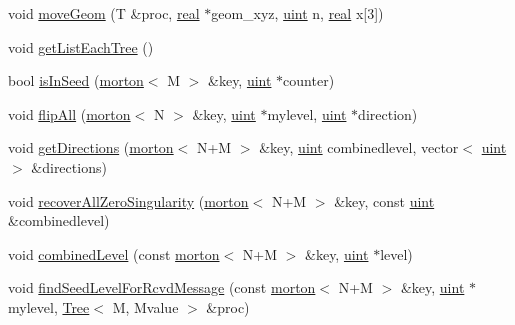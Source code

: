 \begin{DoxyCompactItemize}
void \mbox{\hyperlink{classTemplateForest_a312fad17dc4021537c54119ab91fea87}{move\+Geom}} (T \&proc, \mbox{\hyperlink{definitions_8h_aedc0ad84d1e764530814f57ad931d02a}{real}} $\ast$geom\+\_\+xyz, \mbox{\hyperlink{definitions_8h_a69aa29b598b851b0640aa225a9e5d61d}{uint}} n, \mbox{\hyperlink{definitions_8h_aedc0ad84d1e764530814f57ad931d02a}{real}} x\mbox{[}3\mbox{]})
\item 
void \mbox{\hyperlink{classTemplateForest_abbc3d31a30cf34aa9e511c98ac677627}{get\+List\+Each\+Tree}} ()
\item 
bool \mbox{\hyperlink{classTemplateForest_aacf86db7e5c6a83890d0ae8c03c8ea84}{is\+In\+Seed}} (\mbox{\hyperlink{definitions_8h_af8682350bd8bb38ee9023f7a0a310add}{morton}}$<$ M $>$ \&key, \mbox{\hyperlink{definitions_8h_a69aa29b598b851b0640aa225a9e5d61d}{uint}} $\ast$counter)
\item 
void \mbox{\hyperlink{classTemplateForest_a65bc67d5decd8895c6d397d506ba19c3}{flip\+All}} (\mbox{\hyperlink{definitions_8h_af8682350bd8bb38ee9023f7a0a310add}{morton}}$<$ N $>$ \&key, \mbox{\hyperlink{definitions_8h_a69aa29b598b851b0640aa225a9e5d61d}{uint}} $\ast$mylevel, \mbox{\hyperlink{definitions_8h_a69aa29b598b851b0640aa225a9e5d61d}{uint}} $\ast$direction)
\item 
void \mbox{\hyperlink{classTemplateForest_abcdbb8b1c48c6e94ad86df60e80f36b3}{get\+Directions}} (\mbox{\hyperlink{definitions_8h_af8682350bd8bb38ee9023f7a0a310add}{morton}}$<$ N+M $>$ \&key, \mbox{\hyperlink{definitions_8h_a69aa29b598b851b0640aa225a9e5d61d}{uint}} combinedlevel, vector$<$ \mbox{\hyperlink{definitions_8h_a69aa29b598b851b0640aa225a9e5d61d}{uint}} $>$ \&directions)
\item 
void \mbox{\hyperlink{classTemplateForest_a92e50d5845a52e4bcf19d54b56e1ccf9}{recover\+All\+Zero\+Singularity}} (\mbox{\hyperlink{definitions_8h_af8682350bd8bb38ee9023f7a0a310add}{morton}}$<$ N+M $>$ \&key, const \mbox{\hyperlink{definitions_8h_a69aa29b598b851b0640aa225a9e5d61d}{uint}} \&combinedlevel)
\item 
void \mbox{\hyperlink{classTemplateForest_a3f0c01310e4f1b71e7d88c0f9e859b4d}{combined\+Level}} (const \mbox{\hyperlink{definitions_8h_af8682350bd8bb38ee9023f7a0a310add}{morton}}$<$ N+M $>$ \&key, \mbox{\hyperlink{definitions_8h_a69aa29b598b851b0640aa225a9e5d61d}{uint}} $\ast$level)
\item 
void \mbox{\hyperlink{classTemplateForest_a1d06e6ec854bd4490c116d95f8612bea}{find\+Seed\+Level\+For\+Rcvd\+Message}} (const \mbox{\hyperlink{definitions_8h_af8682350bd8bb38ee9023f7a0a310add}{morton}}$<$ N+M $>$ \&key, \mbox{\hyperlink{definitions_8h_a69aa29b598b851b0640aa225a9e5d61d}{uint}} $\ast$mylevel, \mbox{\hyperlink{classTree}{Tree}}$<$ M, Mvalue $>$ \&proc)

\end{DoxyCompactItemize}
